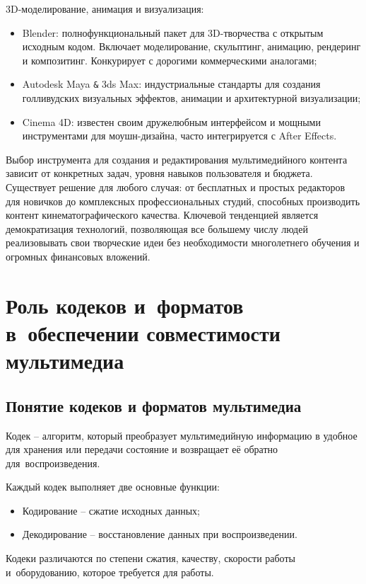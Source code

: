 \documentclass{ou}
\begin{document}
3D-моделирование, анимация и визуализация:
\begin{itemize}[label=-, leftmargin=0em, itemindent=3.35em, nosep]
\item Blender: полнофункциональный пакет для 3D-творчества с открытым исходным кодом. Включает моделирование, скульптинг, анимацию, рендеринг и композитинг. Конкурирует с дорогими коммерческими аналогами;
\item Autodesk Maya \verb|&| 3ds Max: индустриальные стандарты для создания голливудских визуальных эффектов, анимации и архитектурной визуализации;
\item Cinema 4D: известен своим дружелюбным интерфейсом и мощными инструментами для моушн-дизайна, часто интегрируется с After Effects.
\end{itemize}

Выбор инструмента для создания и редактирования мультимедийного контента зависит от конкретных задач, уровня навыков пользователя и бюджета. Существует решение для любого случая: от бесплатных и простых редакторов для новичков до комплексных профессиональных студий, способных производить контент кинематографического качества. Ключевой тенденцией является демократизация технологий, позволяющая все большему числу людей реализовывать свои творческие идеи без необходимости многолетнего обучения и огромных финансовых вложений.
\newpage
\section{Роль кодеков и~форматов в~обеспечении совместимости мультимедиа}
\subsection{Понятие кодеков и форматов мультимедиа}
Кодек -- алгоритм, который преобразует мультимедийную информацию в удобное для хранения или передачи состояние и возвращает её обратно для~воспроизведения.

Каждый кодек выполняет две основные функции:
\begin{itemize}[label=-, leftmargin=0em, itemindent=3.35em, nosep]
\item Кодирование -- сжатие исходных данных;
\item Декодирование -- восстановление данных при воспроизведении.
\end{itemize}

Кодеки различаются по степени сжатия, качеству, скорости работы и~оборудованию, которое требуется для работы.
\end{document}
